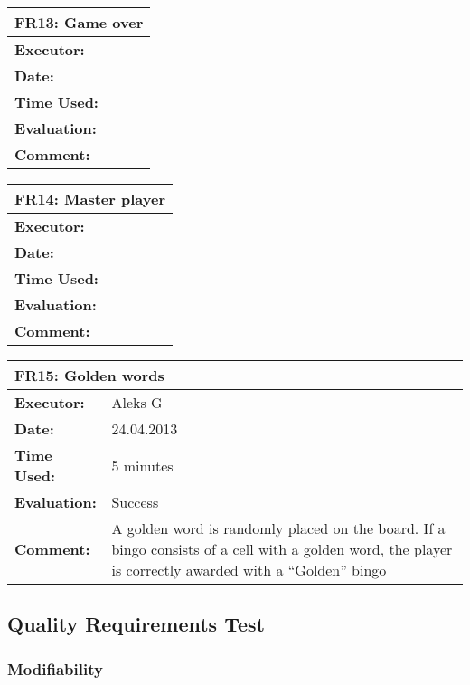 \begin{tabular}{|m{}||m{}|}
\hline
\multicolumn{2}{|l|}{FR13: Game over} \\ \hline
\textbf{Executor:} & \\ \hline
\textbf{Date:} & \\ \hline
\textbf{Time Used:} & \\ \hline
\textbf{Evaluation:} & \\ \hline
\textbf{Comment:} & \\ \hline
\end{tabular}

\begin{tabular}{|m{}||m{}|}
\hline
\multicolumn{2}{|l|}{FR14: Master player} \\ \hline
\textbf{Executor:} & \\ \hline
\textbf{Date:} & \\ \hline
\textbf{Time Used:} & \\ \hline
\textbf{Evaluation:} & \\ \hline
\textbf{Comment:} & \\ \hline
\end{tabular}

\begin{tabular}{|m{}||m{}|}
\hline
\multicolumn{2}{|l|}{FR15: Golden words} \\ \hline
\textbf{Executor:} & Aleks G\\ \hline
\textbf{Date:} & 24.04.2013\\ \hline
\textbf{Time Used:} & 5 minutes\\ \hline
\textbf{Evaluation:} & Success\\ \hline
\textbf{Comment:} & A golden word is randomly placed on the board. If a bingo consists of a cell with a golden word, the player is correctly awarded with a ``Golden'' bingo\\ \hline
\end{tabular}




\subsection{Quality Requirements Test}

\subsubsection{Modifiability}

